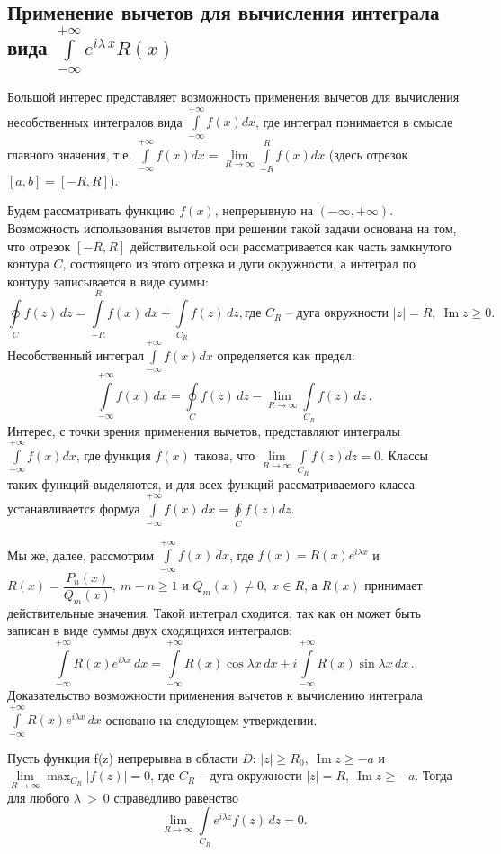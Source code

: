 \subsection{Применение вычетов для вычисления интеграла вида $\int\limits_{-\infty}^{+\infty}e^{i\lambda\,x}R(x)$}
Большой интерес представляет возможность применения вычетов для вычисления несобственных интегралов вида $\textstyle{\int\limits_{-\infty}^{+\infty} f(x)dx}$, где интеграл понимается в смысле главного значения, т.е. $\textstyle{\int\limits_{-\infty}^{+\infty} f(x)dx= \lim\limits_{R\to\infty} \int\limits_{-R}^{R}f(x)dx}$ (здесь отрезок $[a,b]=[-R,R]$). 

Будем рассматривать функцию $f(x)$, непрерывную на $(-\infty,+\infty)$. Возможность использования вычетов при решении такой задачи основана на том, что отрезок $[-R,R]$ действительной оси рассматривается как часть замкнутого контура $C$, состоящего из этого отрезка и дуги окружности, а интеграл по контуру записывается в виде суммы:
$$
\oint\limits_{C} f(z)\,dz= \int\limits_{-R}^{R}f(x)\,dx+ \int\limits_{C_R}f(z)\,dz, \text{где $C_R$ -- дуга окружности } |z|=R,~ \operatorname{Im}z\geqslant0.
$$
Несобственный интеграл$ \textstyle{\int\limits_{-\infty}^{+\infty} f(x)dx}$ определяется как предел:
$$
\int\limits_{-\infty}^{+\infty} f(x)\,dx= \oint\limits_{C}f(z)\,dz-\lim\limits_{R\to\infty} \int\limits_{C_R}f(z)\,dz\,.
$$
Интерес, с точки зрения применения вычетов, представляют интегралы $\textstyle{\int\limits_{-\infty}^{+\infty} f(x)dx}$, где функция $f(x)$ такова, что $\textstyle{\lim\limits_{R\to\infty} \int\limits_{C_R} f(z)dz=0}$. Классы таких функций выделяются, и для всех функций рассматриваемого класса устанавливается формуа $\textstyle{\int\limits_{-\infty}^{+\infty} f(x)\,dx= \oint\limits_{C} f(z)dz}$.

Мы же, далее, рассмотрим $\textstyle{\int\limits_{-\infty}^{+\infty} f(x)\,dx}$, где $f(x)=R(x)e^{i\lambda x}$ и $R(x)= \dfrac{P_n(x)}{Q_m(x)},~m-n \geqslant 1$ и $Q_m(x)\ne0,~ x\in R$, а $R(x)$ принимает действительные значения. Такой интеграл сходится, так как он может быть записан в виде суммы двух сходящихся интегралов:
$$
\int\limits_{-\infty}^{+\infty} R(x)e^{i\lambda x}\,dx= \int\limits_{-\infty}^{+\infty} R(x)\cos\lambda x\,dx+ i\int\limits_{-\infty}^{+\infty} R(x)\sin\lambda x\,dx\,.
$$
Доказательство возможности применения вычетов к вычислению интеграла $\textstyle{\int\limits_{-\infty}^{+\infty} R(x)e^{i\lambda x}\,dx}$ основано на следующем утверждении.
\begin{assertion}
Пусть функция f(z) непрерывна в области $D:\, |z| \geqslant R_0,~ \operatorname{Im}z \geqslant-a$ и $\lim\limits_{R\to\infty} \max_{C_R}|f(z)|=0$, где $C_R$ -- дуга окружности $|z|=R,~ \operatorname{Im}z\geqslant-a$. Тогда для любого $\lambda\:>\:0$ справедливо равенство
$$
\lim\limits_{R\to\infty} \int\limits_{C_R} e^{i\lambda z}f(z)\,dz=0.
$$
\end{assertion}

